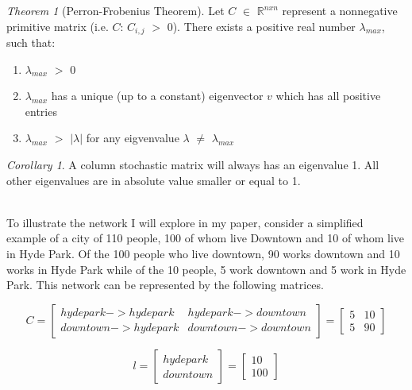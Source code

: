 \documentclass{article}
\theoremstyle{definition}
\theoremstyle{remark}
\newtheorem{theorem}{Theorem}
\newtheorem{corollary}{Corollary}
\begin{document}
\theoremstyle{definition}
\begin{theorem}[Perron-Frobenius Theorem]
\label{pythagorean}
Let $C$ $\in$ $\mathbb{R}^{nxn}$ represent a nonnegative primitive matrix (i.e. $C$: $C_{i,j}$ $>$ 0).  There exists a positive real number $\lambda_{max}$, such that:
\begin{enumerate}
\item $\lambda_{max}$ $>$ 0
\item $\lambda_{max}$ has a unique (up to a constant) eigenvector $v$ which has all positive entries
\item $\lambda_{max}$ $>$ $|\lambda|$ for any eigvenvalue $\lambda$ $\neq$ $\lambda_{max}$
\end{enumerate}

\end{theorem}


\begin{corollary}
A column stochastic matrix will always has an eigenvalue 1. All other eigenvalues are in absolute
value smaller or equal to 1.
\end{corollary}
\\ 

To illustrate the network I will explore in my paper, consider a simplified example of a city of 110 people, 100 of whom live Downtown and 10 of whom live in Hyde Park.  Of the 100 people who live downtown, 90 works downtown and 10 works in Hyde Park while of the 10 people, 5 work downtown and 5 work in Hyde Park.  This network can be represented by the following matrices. 

\begin{equation}
      C
   =
  \begin{bmatrix}
    hyde park->hyde park  & hyde park->downtown\\
    downtown->hyde park  & downtown->downtown
    
  \end{bmatrix} = 
  \begin{bmatrix}
    5 & 10\\
    5 & 90 
  \end{bmatrix}
\end{equation}

\begin{equation}
      l
   =
  \begin{bmatrix}
    hyde park\\
    downtown
    
  \end{bmatrix} = 
  \begin{bmatrix}
    10\\
    100 
  \end{bmatrix}
\end{equation}
\end{document}

